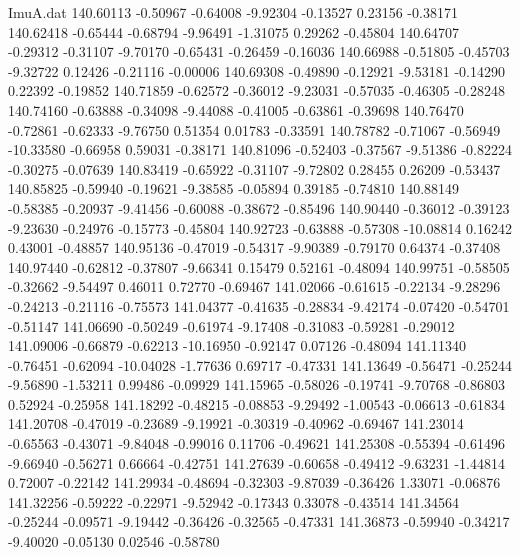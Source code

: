 \begin{filecontents}{ImuA.dat}
 140.60113   -0.50967   -0.64008   -9.92304   -0.13527    0.23156   -0.38171
 140.62418   -0.65444   -0.68794   -9.96491   -1.31075    0.29262   -0.45804
 140.64707   -0.29312   -0.31107   -9.70170   -0.65431   -0.26459   -0.16036
 140.66988   -0.51805   -0.45703   -9.32722    0.12426   -0.21116   -0.00006
 140.69308   -0.49890   -0.12921   -9.53181   -0.14290    0.22392   -0.19852
 140.71859   -0.62572   -0.36012   -9.23031   -0.57035   -0.46305   -0.28248
 140.74160   -0.63888   -0.34098   -9.44088   -0.41005   -0.63861   -0.39698
 140.76470   -0.72861   -0.62333   -9.76750    0.51354    0.01783   -0.33591
 140.78782   -0.71067   -0.56949  -10.33580   -0.66958    0.59031   -0.38171
 140.81096   -0.52403   -0.37567   -9.51386   -0.82224   -0.30275   -0.07639
 140.83419   -0.65922   -0.31107   -9.72802    0.28455    0.26209   -0.53437
 140.85825   -0.59940   -0.19621   -9.38585   -0.05894    0.39185   -0.74810
 140.88149   -0.58385   -0.20937   -9.41456   -0.60088   -0.38672   -0.85496
 140.90440   -0.36012   -0.39123   -9.23630   -0.24976   -0.15773   -0.45804
 140.92723   -0.63888   -0.57308  -10.08814    0.16242    0.43001   -0.48857
 140.95136   -0.47019   -0.54317   -9.90389   -0.79170    0.64374   -0.37408
 140.97440   -0.62812   -0.37807   -9.66341    0.15479    0.52161   -0.48094
 140.99751   -0.58505   -0.32662   -9.54497    0.46011    0.72770   -0.69467
 141.02066   -0.61615   -0.22134   -9.28296   -0.24213   -0.21116   -0.75573
 141.04377   -0.41635   -0.28834   -9.42174   -0.07420   -0.54701   -0.51147
 141.06690   -0.50249   -0.61974   -9.17408   -0.31083   -0.59281   -0.29012
 141.09006   -0.66879   -0.62213  -10.16950   -0.92147    0.07126   -0.48094
 141.11340   -0.76451   -0.62094  -10.04028   -1.77636    0.69717   -0.47331
 141.13649   -0.56471   -0.25244   -9.56890   -1.53211    0.99486   -0.09929
 141.15965   -0.58026   -0.19741   -9.70768   -0.86803    0.52924   -0.25958
 141.18292   -0.48215   -0.08853   -9.29492   -1.00543   -0.06613   -0.61834
 141.20708   -0.47019   -0.23689   -9.19921   -0.30319   -0.40962   -0.69467
 141.23014   -0.65563   -0.43071   -9.84048   -0.99016    0.11706   -0.49621
 141.25308   -0.55394   -0.61496   -9.66940   -0.56271    0.66664   -0.42751
 141.27639   -0.60658   -0.49412   -9.63231   -1.44814    0.72007   -0.22142
 141.29934   -0.48694   -0.32303   -9.87039   -0.36426    1.33071   -0.06876
 141.32256   -0.59222   -0.22971   -9.52942   -0.17343    0.33078   -0.43514
 141.34564   -0.25244   -0.09571   -9.19442   -0.36426   -0.32565   -0.47331
 141.36873   -0.59940   -0.34217   -9.40020   -0.05130    0.02546   -0.58780

\end{filecontents}
